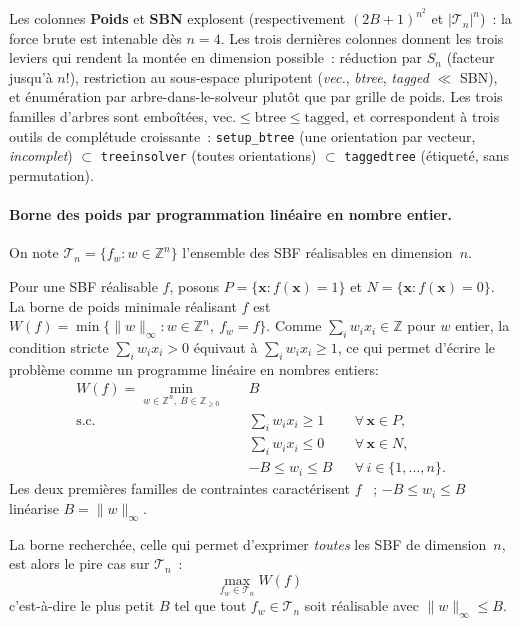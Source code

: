 Les colonnes \textbf{Poids} et \textbf{SBN} explosent (respectivement $(2B+1)^{n^2}$ et
$|\mathcal{T}_n|^n$)~: la force brute est intenable dès $n=4$. Les trois dernières colonnes
donnent les trois leviers qui rendent la montée en dimension possible~: réduction par $S_n$
(facteur jusqu'à $n!$), restriction au sous-espace pluripotent (\emph{vec.}, \emph{btree},
\emph{tagged} $\ll$ SBN), et énumération par arbre-dans-le-solveur plutôt que par grille de
poids. Les trois familles d'arbres sont emboîtées, $\text{vec.}\le\text{btree}\le\text{tagged}$,
et correspondent à trois outils de complétude croissante~: \texttt{setup\_btree} (une orientation
par vecteur, \emph{incomplet}) $\subset$ \texttt{treeinsolver} (toutes orientations) $\subset$
\texttt{taggedtree} (étiqueté, sans permutation).

\paragraph{Borne des poids par programmation linéaire en nombre entier.}

On note $\mathcal{T}_n = \{ f_w : w \in \mathbb{Z}^n \}$ l'ensemble des SBF réalisables
en dimension~$n$.

Pour une SBF réalisable $f$, posons $P = \{\mathbf{x} : f(\mathbf{x}) = 1\}$ et
$N = \{\mathbf{x} : f(\mathbf{x}) = 0\}$. La borne de poids minimale réalisant $f$ est
$W(f) = \min\{ \|w\|_\infty : w \in \mathbb{Z}^n,\ f_w = f \}$. Comme
$\sum_i w_i x_i \in \mathbb{Z}$ pour $w$ entier, la condition stricte
$\sum_i w_i x_i > 0$ équivaut à $\sum_i w_i x_i \ge 1$, ce qui permet d'écrire le problème comme un programme linéaire en nombres entiers:
\begin{equation}
\begin{aligned}
W(f) = \min_{w \in \mathbb{Z}^n,\ B \in \mathbb{Z}_{\ge 0}}\quad & B\\
\text{s.c.}\quad
& \textstyle\sum_i w_i x_i \ge 1 && \forall\, \mathbf{x} \in P,\\
& \textstyle\sum_i w_i x_i \le 0 && \forall\, \mathbf{x} \in N,\\
& -B \le w_i \le B && \forall\, i \in \{1,\dots,n\}.
\end{aligned}
\end{equation}
Les deux premières familles de contraintes caractérisent $f$ ~;  $-B \le w_i \le B$
linéarise $B = \|w\|_\infty$.

La borne recherchée, celle qui permet d'exprimer \emph{toutes} les SBF de
dimension~$n$, est alors le pire cas sur $\mathcal{T}_n$~:
\begin{equation}
\boxed{\max_{f_w \in \mathcal{T}_n} W(f)\ }
\end{equation}
c'est-à-dire le plus petit $B$ tel que tout $f_w \in \mathcal{T}_n$ soit réalisable avec
$\|w\|_\infty \le B$.

